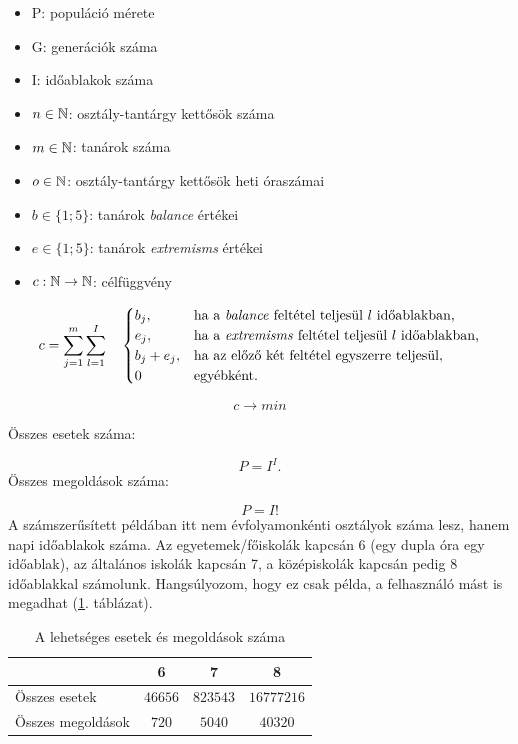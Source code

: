 
\begin{itemize}
	\item P: populáció mérete
	\item G: generációk száma
	\item I: időablakok száma
	\item $n \in \Bbb{N}$: osztály-tantárgy kettősök száma
	\item $m \in \Bbb{N}$: tanárok száma
	\item $o \in \Bbb{N}$: osztály-tantárgy kettősök heti óraszámai
	\item $b \in \{1;5\}$: tanárok \textit{balance} értékei
	\item $e \in \{1;5\}$: tanárok \textit{extremisms} értékei
	\item $c: \Bbb{N} \rightarrow \Bbb{N}$: célfüggvény
\end{itemize}

$$ c=\sum_{j=1}^m \sum_{l=1}^I \quad
\begin{cases}
b_j, & \hbox{ha a \textit{balance} feltétel teljesül }l\hbox{ időablakban,}\\
e_j, & \hbox{ha a \textit{extremisms} feltétel teljesül }l\hbox{ időablakban,}\\
b_j+e_j, & \hbox{ha az előző két feltétel egyszerre teljesül},\\
0 & \hbox{egyébként.}
\end{cases}
$$

$$
c \rightarrow min
$$


Összes esetek száma:

$$P=I^I.$$
Összes megoldások száma:

$$P=I!$$
A számszerűsített példában itt nem évfolyamonkénti osztályok száma lesz, hanem napi időablakok száma. Az egyetemek/főiskolák kapcsán 6 (egy dupla óra egy időablak), az általános iskolák kapcsán 7, a középiskolák kapcsán pedig 8 időablakkal számolunk. Hangsúlyozom, hogy ez csak példa, a felhasználó mást is megadhat (\ref{tab:complexity3}. táblázat).

\begin{table}[h!]
	\centering
	\caption{A lehetséges esetek és megoldások száma}
	\label{tab:complexity3}
	\medskip
\begin{tabular}{|l|c|c|c|}
\hline
& 6 & 7 & 8 \\
\hline
Összes esetek & $46656$ & $823543$ & $16777216$ \\
\hline 
Összes megoldások & $720$ & $5040$ & $40320$ \\
\hline
\end{tabular}
\end{table}

